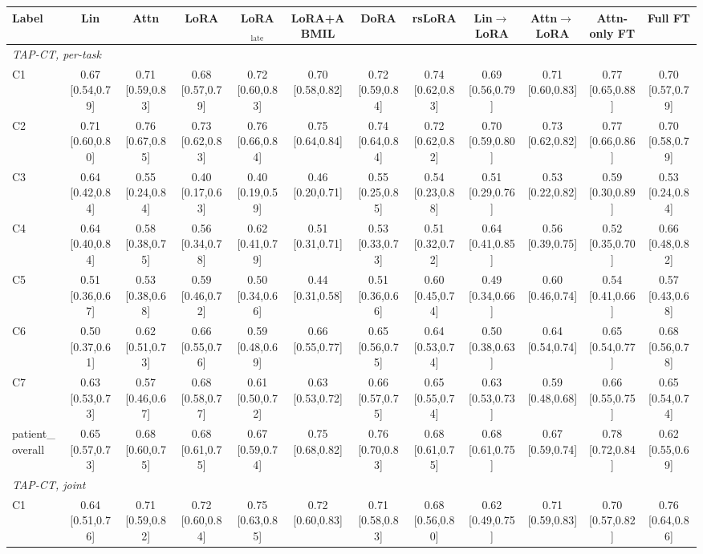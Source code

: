 \begin{tabular}{lccccccccccc}
\toprule
Label & Lin & Attn & LoRA & LoRA$_{\text{late}}$ & LoRA+ABMIL & DoRA & rsLoRA & Lin$\to$LoRA & Attn$\to$LoRA & Attn-only FT & Full FT \\
\midrule
\multicolumn{12}{l}{\textit{TAP-CT, per-task}} \\
C1 & 0.67 [0.54,0.79] & 0.71 [0.59,0.83] & 0.68 [0.57,0.79] & 0.72 [0.60,0.83] & 0.70 [0.58,0.82] & 0.72 [0.59,0.84] & 0.74 [0.62,0.83] & 0.69 [0.56,0.79] & 0.71 [0.60,0.83] & 0.77 [0.65,0.88] & 0.70 [0.57,0.79] \\
C2 & 0.71 [0.60,0.80] & 0.76 [0.67,0.85] & 0.73 [0.62,0.83] & 0.76 [0.66,0.84] & 0.75 [0.64,0.84] & 0.74 [0.64,0.84] & 0.72 [0.62,0.82] & 0.70 [0.59,0.80] & 0.73 [0.62,0.82] & 0.77 [0.66,0.86] & 0.70 [0.58,0.79] \\
C3 & 0.64 [0.42,0.84] & 0.55 [0.24,0.84] & 0.40 [0.17,0.63] & 0.40 [0.19,0.59] & 0.46 [0.20,0.71] & 0.55 [0.25,0.85] & 0.54 [0.23,0.88] & 0.51 [0.29,0.76] & 0.53 [0.22,0.82] & 0.59 [0.30,0.89] & 0.53 [0.24,0.84] \\
C4 & 0.64 [0.40,0.84] & 0.58 [0.38,0.75] & 0.56 [0.34,0.78] & 0.62 [0.41,0.79] & 0.51 [0.31,0.71] & 0.53 [0.33,0.73] & 0.51 [0.32,0.72] & 0.64 [0.41,0.85] & 0.56 [0.39,0.75] & 0.52 [0.35,0.70] & 0.66 [0.48,0.82] \\
C5 & 0.51 [0.36,0.67] & 0.53 [0.38,0.68] & 0.59 [0.46,0.72] & 0.50 [0.34,0.66] & 0.44 [0.31,0.58] & 0.51 [0.36,0.66] & 0.60 [0.45,0.74] & 0.49 [0.34,0.66] & 0.60 [0.46,0.74] & 0.54 [0.41,0.66] & 0.57 [0.43,0.68] \\
C6 & 0.50 [0.37,0.61] & 0.62 [0.51,0.73] & 0.66 [0.55,0.76] & 0.59 [0.48,0.69] & 0.66 [0.55,0.77] & 0.65 [0.56,0.75] & 0.64 [0.53,0.74] & 0.50 [0.38,0.63] & 0.64 [0.54,0.74] & 0.65 [0.54,0.77] & 0.68 [0.56,0.78] \\
C7 & 0.63 [0.53,0.73] & 0.57 [0.46,0.67] & 0.68 [0.58,0.77] & 0.61 [0.50,0.72] & 0.63 [0.53,0.72] & 0.66 [0.57,0.75] & 0.65 [0.55,0.74] & 0.63 [0.53,0.73] & 0.59 [0.48,0.68] & 0.66 [0.55,0.75] & 0.65 [0.54,0.74] \\
patient\_overall & 0.65 [0.57,0.73] & 0.68 [0.60,0.75] & 0.68 [0.61,0.75] & 0.67 [0.59,0.74] & 0.75 [0.68,0.82] & 0.76 [0.70,0.83] & 0.68 [0.61,0.75] & 0.68 [0.61,0.75] & 0.67 [0.59,0.74] & 0.78 [0.72,0.84] & 0.62 [0.55,0.69] \\
\multicolumn{12}{l}{\textit{TAP-CT, joint}} \\
C1 & 0.64 [0.51,0.76] & 0.71 [0.59,0.82] & 0.72 [0.60,0.84] & 0.75 [0.63,0.85] & 0.72 [0.60,0.83] & 0.71 [0.58,0.83] & 0.68 [0.56,0.80] & 0.62 [0.49,0.75] & 0.71 [0.59,0.83] & 0.70 [0.57,0.82] & 0.76 [0.64,0.86] \\

\end{tabular}
